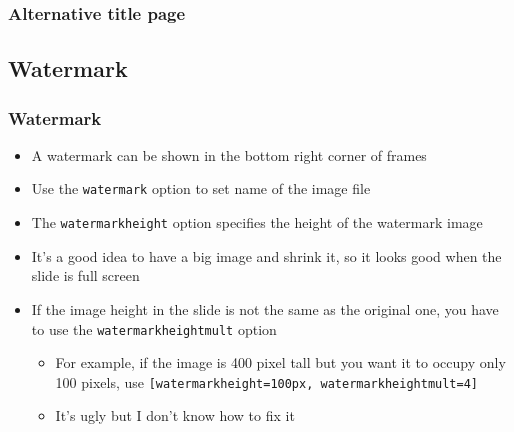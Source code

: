 \begin{frame}[t,fragile]
    \frametitle{Alternative title page}
\end{frame}

\subsection{Watermark}
\begin{frame}[t,fragile]
    \frametitle{Watermark}
\begin{itemize}
\item A watermark can be shown in the bottom right corner of frames
\item Use the \verb!watermark! option to set name of the image file
\item The \verb!watermarkheight! option specifies the height of the watermark
      image
\item It's a good idea to have a big image and shrink it, so it looks good
      when the slide is full screen
\item If the image height in the slide is not the same as the original one,
      you have to use the \verb!watermarkheightmult! option
  \begin{itemize}
  \item For example, if the image is 400 pixel tall but you want it to
        occupy only 100 pixels, use
        \verb![watermarkheight=100px, watermarkheightmult=4]!
  \item It's ugly but I don't know how to fix it
  \end{itemize}
\end{itemize}
\end{frame}

